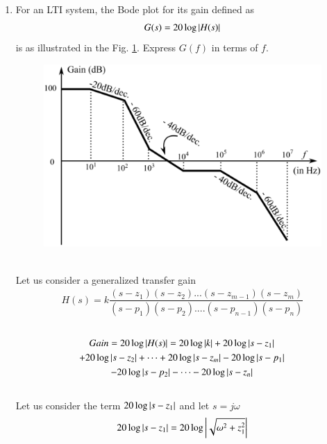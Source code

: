 \begin{enumerate}[label=\thesection.\arabic*.,ref=\thesection.\theenumi]

\item For an LTI system, the Bode plot for its gain defined as
\begin{align}
	G(s) = 20\log\abs{H(s)}
	\label{eq:ee18btech11001_gain}
\end{align}
is as illustrated in the Fig. \ref{fig:ee18btech11001_bode}. Express $G(f)$ in terms of $f$.\\
\begin{figure}[ht!]
    \includegraphics[width=\columnwidth]{./figs/ee18btech11001/ee18btech11001.eps}
    \caption{}
    \label{fig:ee18btech11001_bode}
\end{figure}\\

\solution
Let us consider a generalized transfer gain\\
\begin{align}
	H(s) = k \dfrac{(s-z_{1})(s-z_{2})...(s-z_{m-1})(s-z_{m})}{(s-p_{1})(s-p_{2})....(s-p_{n-1})(s-p_{n})}
\end{align}\\
\begin{multline}
	Gain = 20\log\left\vert H(s)\right\vert = 20\log \left\vert k\right\vert + 20\log \left\vert s-z_{1}\right\vert 
	    \\
	    + 20\log \left\vert s-z_{2}\right\vert + \dots + 20\log \left\vert s-z_{m}\right\vert - 20\log \left\vert s-p_{1}\right\vert 
	    \\
	    - 20\log \left\vert s-p_{2}\right\vert - \dots - 20\log \left\vert s-z_{n}\right\vert 
\end{multline}\\

Let us consider the term $ 20\log \left\vert s-z_{1}\right\vert $ and let $s = j\omega$\\
\begin{align}
	20\log \left\vert s-z_{1}\right\vert = 20\log \left\vert\sqrt{\omega^{2} + z_{1}^{2}}\right\vert
\end{align}\\


\end{enumerate}

